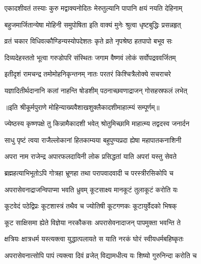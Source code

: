 \twolineshloka
{एकादशीवतं तस्याः कुरु मद्वाक्यनोदितः}
{मेरुतुल्यानि पापानि क्षयं नयति देहिनाम्} %

\twolineshloka
{बहुजमार्जितान्येषा मोहिनी समुपोषिता}
{इति वाक्यं मुनेः श्रुत्वा धृष्टबुद्धिः प्रसन्नहृत्} %

\twolineshloka
{व्रतं चकार विधिवत्कौण्डिन्यस्योपदेशतः}
{कृते व्रते नृपश्रेष्ठ हतपापो बभूव सः} %

\twolineshloka
{दिव्यदेहस्ततो भूत्वा गरुडोपरि संस्थितः}
{जगाम वैष्णवं लोकं सर्वोपद्रववर्जितम्} %

\twolineshloka
{इतीदृशं रामचन्द्र तमोमोहनिकृन्तनम्}
{नातः परतरं किश्चित्रैलोक्ये सचराचरे} %

\twolineshloka
{यज्ञादितीर्थदानानि कलां नाहन्ति षोडशीम्}
{पठनाच्छवणाद्राजन् गोसहस्रफलं लभेत्} %

॥इति श्रीकूर्मपुराणे मोहिन्याख्यवैशाखशुक्लैकादशीमाहात्म्यं सम्पूर्णम्॥


\hyperref[sec:ekadashi_mahatmyam_vrata_raja]{\closesub}
\clearpage

\label{sec:vrata-raja-jyeshtha-krishnapara}


\twolineshloka
{ज्येष्ठस्य कृष्णपक्षे तु किन्नामैकादशी भवेत्}
{श्रोतुमिच्छामि माहात्म्य तद्वदस्व जनार्दन} %


\twolineshloka
{साधु पृष्टं त्वया राजैल्लोकानां हितकाम्यया}
{बहुपुण्यप्रदा ह्येषा महापातकनाशिनी} %

\twolineshloka
{अपरा नाम राजेन्द्र अपारफलदायिनी}
{लोक प्रसिद्धतां याति अपरां यस्तु सेवते} %

\twolineshloka
{ब्रह्महत्याभिभूतोऽपि गोत्रहा भ्रूणहा तथा}
{परापवादवादी च परस्त्रीरसिकोपि च} %

\twolineshloka
{अपरासेवनाद्राजन्विपाप्मा भवति ध्रुवम्}
{कूटसाक्ष्य मानकूटं तुलाकूटं करोति यः} %

\twolineshloka
{कूटवेदं पठेद्विप्रः कूटशास्त्रं तथैव च}
{ज्योतिषी कूटगणकः कूटायुर्वेदको भिषक्} %

\twolineshloka
{कूट साक्षिसमा ह्येते विज्ञेया नरकौकसः}
{अपरासेवनादाजन् पापमुक्ता भवन्ति ते} %

\twolineshloka
{क्षत्रियः क्षात्रधर्म यस्त्यक्त्वा युद्धात्पलायते}
{स याति नरकं घोरं स्वीयधर्मबहिष्कृतः} %

\twolineshloka
{अपरासेवनात्सोपि पापं त्यक्त्वा दिवं व्रजेत्}
{विद्यामधीत्य यः शिष्यो गुरुनिन्दा करोति च} %

